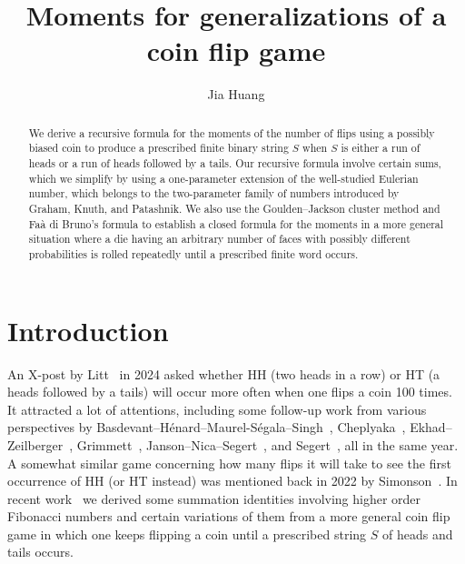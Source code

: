 \documentclass[10pt]{amsart}
\theoremstyle{definition}
\theoremstyle{remark}
\begin{document}
\title{Moments for generalizations of a coin flip game}
\author{Jia Huang}
\address{Department of Mathematics and Statistics, University of Nebraska at Kearney, Kearney, NE 68849, USA}



\begin{abstract}
We derive a recursive formula for the moments of the number of flips using a possibly biased coin to produce a prescribed finite binary string $S$ when $S$ is either a run of heads or a run of heads followed by a tails.
Our recursive formula involve certain sums, which we simplify by using a one-parameter extension of the well-studied Eulerian number, which belongs to the two-parameter family of numbers introduced by Graham, Knuth, and Patashnik.
We also use the Goulden--Jackson cluster method and Fa\`a di Bruno's formula to establish a closed formula for the moments in a more general situation where a die having an arbitrary number of faces with possibly different probabilities is rolled repeatedly until a prescribed finite word occurs.
\end{abstract}

\maketitle

\section{Introduction}\label{sec:intro}


An X-post by Litt~\cite{Litt} in 2024 asked whether HH (two heads in a row) or HT (a heads followed by a tails) will occur more often when one flips a coin 100 times.
It attracted a lot of attentions, including some follow-up work from various perspectives by Basdevant--H\'enard--Maurel-S\'egala--Singh~\cite{BHMS}, Cheplyaka~\cite{Cheplyaka}, Ekhad--Zeilberger~\cite{EkhadZeilberger}, Grimmett~\cite{Grimmett}, Janson--Nica--Segert~\cite{JNS}, and Segert~\cite{Segert}, all in the same year.
A somewhat similar game concerning how many flips it will take to see the first occurrence of HH (or HT instead) was mentioned back in 2022 by Simonson~\cite[Ch.~2]{Simonson}.
In recent work~\cite{Huang} we derived some summation identities involving higher order Fibonacci numbers and certain variations of them from a more general coin flip game in which one keeps flipping a coin until a prescribed string $S$ of heads and tails occurs. 
\end{document}
